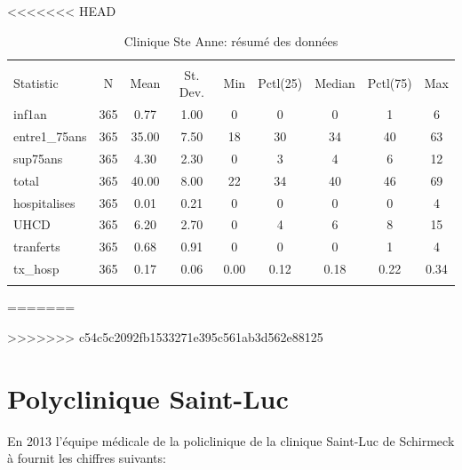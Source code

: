 \documentclass[12pt,english,french,twoside]{book}\usepackage[]{graphicx}\usepackage[]{color}
\makeatletter
\newenvironment{kframe}{%
 \def\at@end@of@kframe{}%
 \ifinner\ifhmode%
  \def\at@end@of@kframe{\end{minipage}}%
  \begin{minipage}{\columnwidth}%
 \fi\fi%
 \def\FrameCommand##1{\hskip\@totalleftmargin \hskip-\fboxsep
 \colorbox{shadecolor}{##1}\hskip-\fboxsep
     \hskip-\linewidth \hskip-\@totalleftmargin \hskip\columnwidth}%
 \MakeFramed {\advance\hsize-\width
   \@totalleftmargin\z@ \linewidth\hsize
   \@setminipage}}%
 {\par\unskip\endMakeFramed%
 \at@end@of@kframe}
\makeatother
\begin{document}
<<<<<<< HEAD
\begin{table}[!htbp] \centering 
  \caption{Clinique Ste Anne: résumé des données} 
  \label{} 
\begin{tabular}{@{\extracolsep{5pt}}lcccccccc} 
\\[-1.8ex]\hline 
\hline \\[-1.8ex] 
Statistic & \multicolumn{1}{c}{N} & \multicolumn{1}{c}{Mean} & \multicolumn{1}{c}{St. Dev.} & \multicolumn{1}{c}{Min} & \multicolumn{1}{c}{Pctl(25)} & \multicolumn{1}{c}{Median} & \multicolumn{1}{c}{Pctl(75)} & \multicolumn{1}{c}{Max} \\ 
inf1an & 365 & 0.77 & 1.00 & 0 & 0 & 0 & 1 & 6 \\ 
entre1\_75ans & 365 & 35.00 & 7.50 & 18 & 30 & 34 & 40 & 63 \\ 
sup75ans & 365 & 4.30 & 2.30 & 0 & 3 & 4 & 6 & 12 \\ 
total & 365 & 40.00 & 8.00 & 22 & 34 & 40 & 46 & 69 \\ 
hospitalises & 365 & 0.01 & 0.21 & 0 & 0 & 0 & 0 & 4 \\ 
UHCD & 365 & 6.20 & 2.70 & 0 & 4 & 6 & 8 & 15 \\ 
tranferts & 365 & 0.68 & 0.91 & 0 & 0 & 0 & 1 & 4 \\ 
tx\_hosp & 365 & 0.17 & 0.06 & 0.00 & 0.12 & 0.18 & 0.22 & 0.34 \\ 
\hline \\[-1.8ex] 
\end{tabular} 
\end{table} 
=======
\begin{kframe}

>>>>>>> c54c5c2092fb1533271e395c561ab3d562e88125

{\ttfamily\noindent\bfseries\color{errorcolor}{\#\# Error: objet de type 'closure' non indiçable}}\end{kframe}



\chapter{Polyclinique Saint-Luc}


En 2013 l'équipe médicale de la policlinique de la clinique Saint-Luc de Schirmeck à fournit les chiffres suivants:
\end{document}
